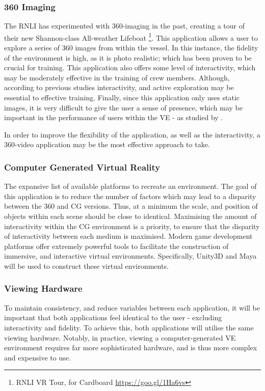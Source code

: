 \documentclass[a4paper, openright, twoside]{report}
\begin{document}
\subsubsection{360 Imaging}
The RNLI has experimented with 360-imaging in the past, creating a tour of their new Shannon-class All-weather Lifeboat \footnote{RNLI VR Tour, for Cardboard \url{https://goo.gl/1Ha6vs}}. This application allows a user to explore a series of 360 images from within the vessel. In this instance, the fidelity of the environment is high, as it is photo realistic; which has been proven to be crucial for training. This application also offers some level of interactivity, which may be moderately effective in the training of crew members. Although, according to previous studies interactivity, and active exploration may be essential to effective training. Finally, since this application only uses static images, it is very difficult to give the user a sense of presence, which may be important in the performance of users within the VE - as studied by \cite{coxon}.

In order to improve the flexibility of the application, as well as the interactivity, a 360-video application may be the most effective approach to take.

\subsubsection{Computer Generated Virtual Reality}
The expansive list of available platforms to recreate an environment. The goal of this application is to reduce the number of factors which may lead to a disparity between the 360 and CG versions. Thus, at a minimum the scale, and position of objects within each scene should be close to identical. Maximising the amount of interactivity within the CG environment is a priority, to ensure that the disparity of interactivity between each medium is maximised. Modern game development platforms offer extremely powerful tools to facilitate the construction of immersive, and interactive virtual environments. Specifically, Unity3D and Maya will be used to construct these virtual environments. 

\subsubsection{Viewing Hardware}
To maintain consistency, and reduce variables between each application, it will be important that both applications feel identical to the user - excluding interactivity and fidelity. To achieve this, both applications will utilise the same viewing  hardware. Notably, in practice, viewing a computer-generated VE environment requires far more sophisticated hardware, and is thus more complex and expensive to use. 
\end{document}
